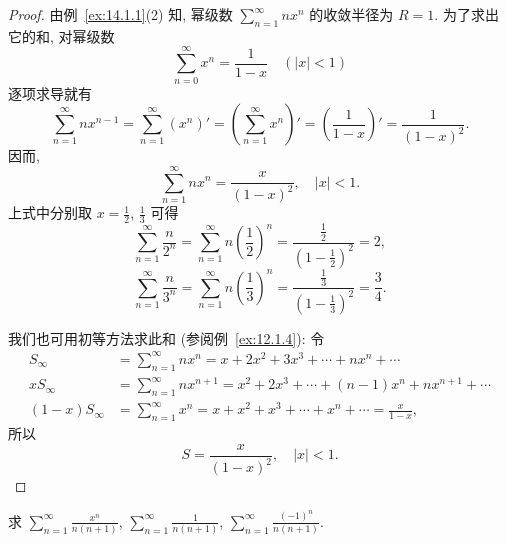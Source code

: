 \begin{proof}
由例~\ref{ex:14.1.1}(2) 知, 幂级数 $\sum_{n=1}^{\infty}nx^{n}$ 的收敛半径为 $R=1$. 为了求出它的和, 对幂级数
\[
  \sum_{n=0}^{\infty}x^{n}=\frac{1}{1-x}\quad(|x|<1)
\]
逐项求导就有
\[
  \sum_{n=1}^{\infty}nx^{n-1}=\sum_{n=1}^{\infty}(x^{n})'=\left(\sum_{n=1}^{\infty}x^{n}\right)'=\left(\frac{1}{1-x}\right)'=\frac{1}{(1-x)^{2}}.
\]
因而,
\[
  \sum_{n=1}^{\infty}nx^{n}=\frac{x}{(1-x)^{2}},\quad|x|<1.
\]
上式中分别取 $x=\frac{1}{2}$, $\frac{1}{3}$ 可得
\[
  \sum_{n=1}^{\infty}\frac{n}{2^{n}}=\sum_{n=1}^{\infty}n\left(\frac{1}{2}\right)^{n}=\frac{\frac{1}{2}}{\left(1-\frac{1}{2}\right)^{2}}=2,
\]
\[
  \sum_{n=1}^{\infty}\frac{n}{3^{n}}=\sum_{n=1}^{\infty}n\left(\frac{1}{3}\right)^{n}=\frac{\frac{1}{3}}{\left(1-\frac{1}{3}\right)^{2}}=\frac{3}{4}.
\]

我们也可用初等方法求此和 (参阅例~\ref{ex:12.1.4}): 令
\[
  \begin{aligned}
    S_{\infty}&=\sum_{n=1}^{\infty}nx^{n}=x+2x^{2}+3x^{3}+\cdots+nx^{n}+\cdots\\
    xS_{\infty}&=\sum_{n=1}^{\infty}nx^{n+1}=x^{2}+2x^{3}+\cdots+(n-1)x^{n}+nx^{n+1}+\cdots\\
    (1-x)S_{\infty}&=\sum_{n=1}^{\infty}x^{n}=x+x^{2}+x^{3}+\cdots+x^{n}+\cdots=\frac{x}{1-x},
  \end{aligned}
\]
所以
\[
  S=\frac{x}{(1-x)^{2}},\quad|x|<1.
\]
\end{proof}

\begin{example}\label{ex:14.1.6}
求 $\sum_{n=1}^{\infty}\frac{x^{n}}{n(n+1)}$, $\sum_{n=1}^{\infty}\frac{1}{n(n+1)}$, $\sum_{n=1}^{\infty}\frac{(-1)^{n}}{n(n+1)}$.
\end{example}

